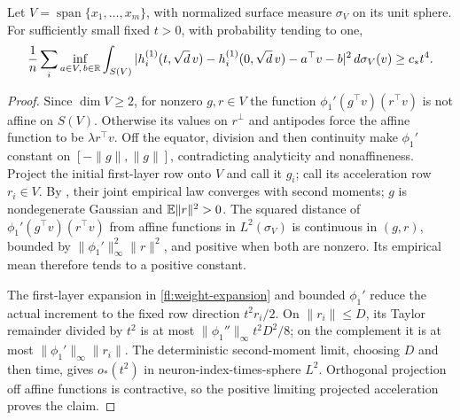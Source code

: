 \begin{lemma}
\label{fl:nonlinear-feature}
Let $V=\operatorname{span}\{x_1,\ldots,x_m\}$, with normalized surface
measure $\sigma_V$ on its unit sphere. For sufficiently small fixed $t>0$,
with probability tending to one,
\begin{equation}
 \frac1n\sum_i\inf_{a\in V,\,b\in\mathbb R}
 \int_{S(V)}|h_i^{(1)}(t,\sqrt d\,v)-h_i^{(1)}(0,\sqrt d\,v)
                  -a^\top v-b|^2\,d\sigma_V(v)\ge c_*t^4.
 \label{fl:nonlinear-increment}
\end{equation}
\end{lemma}
\begin{proof}
Since $\dim V\ge2$, for nonzero $g,r\in V$ the function
$\phi_1'(g^\top v)(r^\top v)$ is not affine on $S(V)$.
Otherwise its values on $r^\perp$ and antipodes force the affine function
to be $\lambda r^\top v$. Off the equator, division and then continuity
make $\phi_1'$ constant on $[-\|g\|,\|g\|]$, contradicting analyticity
and nonaffineness. Project the initial first-layer row onto $V$ and call it
$g_i$; call its acceleration row $r_i\in V$. By ,
their joint empirical law converges with second moments; $g$ is nondegenerate
Gaussian and $\mathbb E\|r\|^2>0$. The squared distance of
$\phi_1'(g^\top v)(r^\top v)$ from affine functions in $L^2(\sigma_V)$
is continuous in $(g,r)$, bounded by $\|\phi_1'\|_\infty^2\|r\|^2$,
and positive when both are nonzero. Its empirical mean therefore tends to
a positive constant.

The first-layer expansion in \eqref{fl:weight-expansion} and bounded
$\phi_1'$ reduce the actual increment to the fixed row direction
$t^2r_i/2$. On $\|r_i\|\le D$, its Taylor remainder divided by $t^2$
is at most $\|\phi_1''\|_\infty t^2D^2/8$; on the complement it is
at most $\|\phi_1'\|_\infty\|r_i\|$. The deterministic second-moment
limit, choosing $D$ and then time, gives $o_*(t^2)$ in neuron-index-times-sphere
$L^2$. Orthogonal projection off affine functions is contractive, so the
positive limiting projected acceleration proves the claim.
\end{proof}

